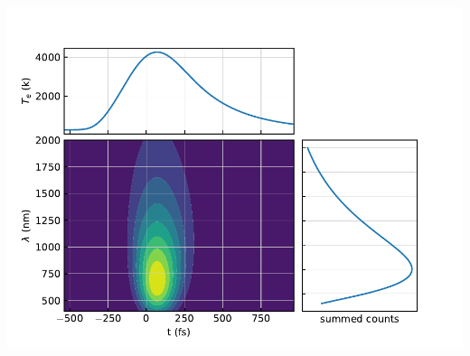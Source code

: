 \begin{frame}
	\centering
	\includegraphics[width=.8\textwidth]{../model/figures/steak view.pdf}
\end{frame}
